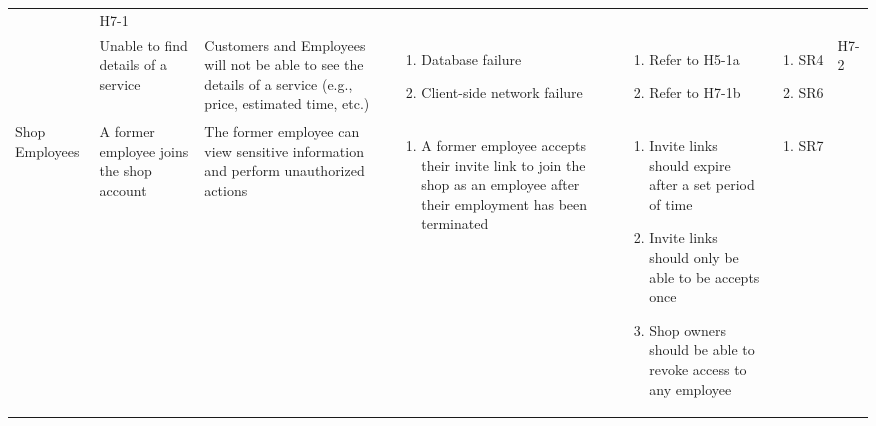\documentclass{article}
\begin{document}
\begin{landscape}
\begin{longtable}{|p{}|p{}|p{}|p{}|p{}|p{}|p{}|}
\begin{enumerate}[label=\alph*., leftmargin=*]
		   \end{enumerate}
		 & H7-1                                                                                                         \\
		\cline{2-7}
		~
		 & Unable to find details of a service
		 & Customers and Employees will not be able to see the details of a service (e.g., price, estimated time, etc.)
		 & \begin{enumerate}[label=\alph*., leftmargin=*]
			   \item Database failure
			   \item Client-side network failure
		   \end{enumerate}
		 & \begin{enumerate}[label=\alph*., leftmargin=*]
			   \item Refer to H5-1a
			   \item Refer to H7-1b
		   \end{enumerate}
		 & \begin{enumerate}[label=\alph*., leftmargin=*]
			   \item SR4
			   \item SR6
		   \end{enumerate}
		 & H7-2                                                                                                         \\
		\hline
		\multirow{2}{*}{Shop Employees}
		 & A former employee joins the shop account
		 & The former employee can view sensitive information and perform unauthorized actions
		 & \begin{enumerate}[label=\alph*., leftmargin=*]
			   \item A former employee accepts their invite link to join the shop as an employee after their employment
			         has been terminated
		   \end{enumerate}
		 & \begin{enumerate}[label=\alph*., leftmargin=*]
			   \item Invite links should expire after a set period of time
			   \item Invite links should only be able to be accepts once
			   \item Shop owners should be able to revoke access to any employee
		   \end{enumerate}
		 & \begin{enumerate}[label=\alph*., leftmargin=*]
			   \item SR7
		   \end{enumerate}

\end{longtable}
\end{landscape}
\end{document}
